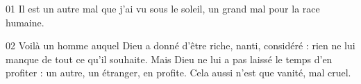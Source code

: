 01 Il est un autre mal que j’ai vu sous le soleil, un grand mal pour la race humaine.

02 Voilà un homme auquel Dieu a donné d’être riche, nanti, considéré : rien ne lui manque de tout ce qu’il souhaite. Mais Dieu ne lui a pas laissé le temps d’en profiter : un autre, un étranger, en profite. Cela aussi n’est que vanité, mal cruel.
